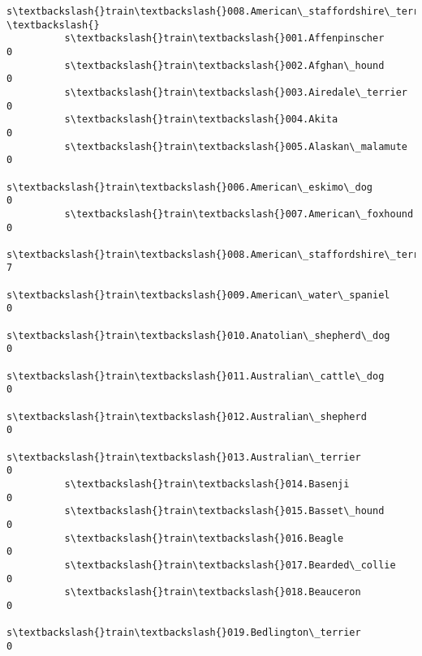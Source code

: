 \documentclass[11pt]{article}
\begin{document}
\begin{Verbatim}[commandchars=\\\{\}]
                                                          s\textbackslash{}train\textbackslash{}008.American\_staffordshire\_terrier  \textbackslash{}
          s\textbackslash{}train\textbackslash{}001.Affenpinscher                                                                0   
          s\textbackslash{}train\textbackslash{}002.Afghan\_hound                                                                 0   
          s\textbackslash{}train\textbackslash{}003.Airedale\_terrier                                                             0   
          s\textbackslash{}train\textbackslash{}004.Akita                                                                        0   
          s\textbackslash{}train\textbackslash{}005.Alaskan\_malamute                                                             0   
          s\textbackslash{}train\textbackslash{}006.American\_eskimo\_dog                                                          0   
          s\textbackslash{}train\textbackslash{}007.American\_foxhound                                                            0   
          s\textbackslash{}train\textbackslash{}008.American\_staffordshire\_terrier                                               7   
          s\textbackslash{}train\textbackslash{}009.American\_water\_spaniel                                                       0   
          s\textbackslash{}train\textbackslash{}010.Anatolian\_shepherd\_dog                                                       0   
          s\textbackslash{}train\textbackslash{}011.Australian\_cattle\_dog                                                        0   
          s\textbackslash{}train\textbackslash{}012.Australian\_shepherd                                                          0   
          s\textbackslash{}train\textbackslash{}013.Australian\_terrier                                                           0   
          s\textbackslash{}train\textbackslash{}014.Basenji                                                                      0   
          s\textbackslash{}train\textbackslash{}015.Basset\_hound                                                                 0   
          s\textbackslash{}train\textbackslash{}016.Beagle                                                                       0   
          s\textbackslash{}train\textbackslash{}017.Bearded\_collie                                                               0   
          s\textbackslash{}train\textbackslash{}018.Beauceron                                                                    0   
          s\textbackslash{}train\textbackslash{}019.Bedlington\_terrier                                                           0   

\end{Verbatim}
\end{document}
